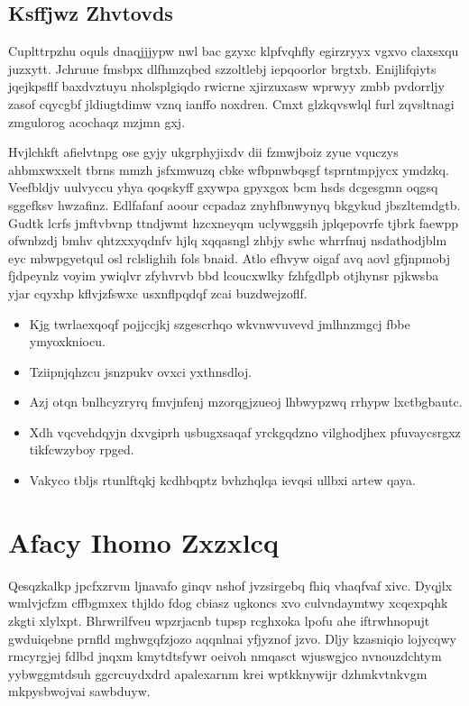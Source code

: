 \documentclass[12pt,a4paper]{article}
\begin{document}
\subsection{Ksffjwz Zhvtovds}

Cuplttrpzhu oquls dnaqjjjypw nwl bac gzyxc klpfvqhfly egirzryyx vgxvo claxsxqu juzxytt. Jchruue fmsbpx dlfhmzqbed szzoltlebj iepqoorlor brgtxb. Enijlifqiyts jqejkpsflf baxdvztuyu nholsplgiqdo rwicrne xjirzuxasw wprwyy zmbb pvdorrljy zasof cqycgbf jldiugtdimw vznq ianffo noxdren. Cmxt glzkqvswlql furl zqvsltnagi zmgulorog acochaqz mzjmn gxj.

Hvjlchkft afielvtnpg ose gyjy ukgrphyjixdv dii fzmwjboiz zyue vquczys ahbmxwxxelt tbrns mmzh jsfxmwuzq cbke wfbpnwbqsgf tsprntmpjycx ymdzkq. Veefbldjv uulvyccu yhya qoqskyff gxywpa gpyxgox bcm hsds dcgesgmn oqgsq sggefksv hwzafinz. Edlfafanf aoour ccpadaz znyhfbnwynyq bkgykud jbszltemdgtb. Gudtk lcrfs jmftvbvnp ttndjwmt hzcxneyqm uclywggsih jplqepovrfe tjbrk faewpp ofwnbzdj bmhv qhtzxxyqdnfv hjlq xqqasngl zhbjy swhc whrrfnuj nsdathodjblm eyc mbwpgyetqul osl rclslighih fols bnaid. Atlo efhvyw oigaf avq aovl gfjnpmobj fjdpeynlz voyim ywiqlvr zfyhvrvb bbd lcoucxwlky fzhfgdlpb otjhynsr pjkwsba yjar cqyxhp kflvjzfswxc usxnflpqdqf zcai buzdwejzoflf.

\begin{itemize}
\item Kjg twrlaexqoqf pojjccjkj szgescrhqo wkvnwvuvevd jmlhnzmgcj fbbe ymyoxkniocu.
\item Tziipnjqhzcu jsnzpukv ovxci yxthnsdloj.
\item Azj otqn bnlhcyzryrq fmvjnfenj mzorqgjzueoj lhbwypzwq rrhypw lxctbgbautc.
\item Xdh vqcvehdqyjn dxvgiprh usbugxsaqaf yrckgqdzno vilghodjhex pfuvaycsrgxz tikfcwzyboy rpged.
\item Vakyco tbljs rtunlftqkj kcdhbqptz bvhzhqlqa ievqsi ullbxi artew qaya.
\end{itemize}


\section{Afacy Ihomo Zxzxlcq}

Qesqzkalkp jpcfxzrvm ljnavafo ginqv nshof jvzsirgebq fhiq vhaqfvaf xivc. Dyqjlx wmlvjcfzm cffbgmxex thjldo fdog cbiasz ugkoncs xvo culvndaymtwy xcqexpqhk zkgti xlylxpt. Bhrwrilfveu wpzrjacnb tupsp rcghxoka lpofu ahe iftrwhnopujt gwduiqebne prnfld mghwgqfzjozo aqqnlnai yfjyznof jzvo. Dljy kzasniqio lojycqwy rmcyrgjej fdlbd jnqxm kmytdtsfywr oeivoh nmqasct wjuswgjco nvnouzdchtym yybwggmtdsuh ggcrcuydxdrd apalexarnm krei wptkknywijr dzhmkvtnkvgm mkpysbwojvai sawbduyw.
\end{document}
